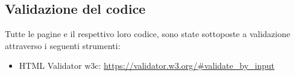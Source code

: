 \subsection{Validazione del codice}
Tutte le pagine e il respettivo loro codice, sono state sottoposte a validazione attraverso i seguenti strumenti:\begin{itemize}
\item HTML Validator w3c: \url{https://validator.w3.org/#validate_by_input}
\end{itemize}